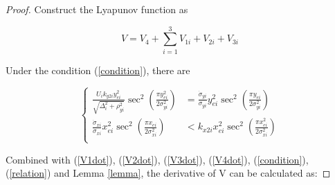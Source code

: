 \documentclass[english]{cccconf}
\begin{document}
\begin{proof} 
Construct the Lyapunov function as

\begin{equation}\label{V}
	V=V_4+\sum^3_{i=1}V_{1i}+V_{2i}+V_{3i}
\end{equation}

Under the condition (\ref{condition}), there are 

\begin{equation}\label{relation}
	\left\{
	\begin{aligned}
	\frac{U_ik_{y2i}y^2_{ei}}{\sqrt{\Delta^2_i+\rho^2_{yi}}}\sec^2(\frac{\pi y^2_{ei}}{2\sigma^2_{yi}})&=\frac{\dot{\sigma}_{yi}}{\sigma_{yi}}y^2_{ei}\sec^2(\frac{\pi y_{ei}}{2\sigma^2_{yi}})\\
	\frac{\dot{\sigma}_{xi}}{\sigma_{xi}}x^2_{ei}\sec^2(\frac{\pi x_{ei}}{2\sigma^2_{xi}})&<k_{x2i}x^2_{ei}\sec^2(\frac{\pi x^2_{ei}}{2\sigma^2_{xi}})\\
\end{aligned}
\right.
\end{equation}
 
Combined with (\ref{V1dot}), (\ref{V2dot}), (\ref{V3dot}), (\ref{V4dot}), (\ref{condition}), (\ref{relation}) and Lemma \ref{lemma},  the derivative of V can be calculated as:


\end{proof}
\end{document}
